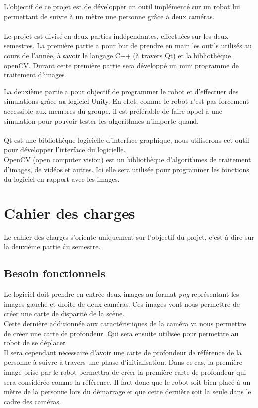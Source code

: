 \documentclass[12pt,a4paper]{report}
\begin{document}
L'objectif de ce projet est de développer un outil implémenté sur un robot lui permettant de suivre à un mètre une personne grâce à deux caméras.\\\\

Le projet est divisé en deux parties indépendantes, effectuées sur les deux semestres. 
La première partie a pour but de prendre en main les outils utilisés au cours de l'année, à savoir le langage C++ (à travers Qt) et la bibliothèque openCV.
Durant cette première partie sera développé un mini programme de traitement d'images. 

La deuxième partie a pour objectif de programmer le robot et d'effectuer des simulations grâce au logiciel Unity. En effet, comme le robot n'est pas forcement accessible aux membres du groupe, il est préférable de faire appel à une simulation pour pouvoir tester les algorithmes n'importe quand.\\\\

Qt est une bibliothèque logicielle d'interface graphique, nous utiliserons cet outil pour développer l'interface du logicielle.\\

OpenCV (open computer vision) est un bibliothèque d'algorithmes de traitement d'images, de vidéos et autres. Ici elle sera utilisée pour programmer les fonctions du logiciel en rapport avec les images.\\


\section{Cahier des charges}
Le cahier des charges s'oriente uniquement sur l'objectif du projet, c'est à dire sur la deuxième partie du semestre.
\subsection{Besoin fonctionnels}
	Le logiciel doit prendre en entrée deux images au format \textit{png} représentant les images gauche et droite de deux caméras.
	Ces images vont nous permettre de créer une carte de disparité de la scène.\\	
	Cette dernière additionnée aux caractéristiques de la caméra va nous permettre de créer une carte de profondeur. Qui sera ensuite utilisée pour permettre au robot de se déplacer.\\
	Il sera cependant nécessaire d'avoir une carte de profondeur de référence de la personne à suivre à travers une phase d'initialisation. Dans ce cas, la première image prise par le robot permettra de créer la première carte de profondeur qui sera considérée comme la référence. Il faut donc que le robot soit bien placé à un mètre de la personne lors du démarrage et que cette dernière soit la seule dans le cadre des caméras.
\end{document}
